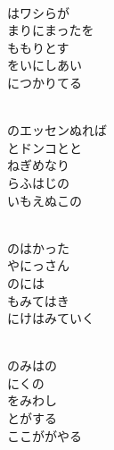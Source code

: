 \documentclass[10pt,b5j]{tarticle} %
\begin{document}
\vspace{1.5em} %
\newcommand{\linespace}{0.5em} %
\newcommand{\blocksize}{0.5\hsize} %
\newcommand{\itemmargin}{6em} %
\begin{enumerate} %
    \setlength{\itemindent}{\itemmargin} %
    \begin{minipage}[c]{\blocksize}
    
        \vspace{\linespace}
        \item~\\
        はワシらが\\
        まりにまったを\\
        ももりとす\\
        をいにしあい\\
        につかりてる
        
        \vspace{\linespace}
        \item~\\
        のエッセンぬれば\\
        とドンコとと\\
        ねぎめなり\\
        らふはじの\\
        いもえぬこの
        
        \vspace{\linespace}
        \item~\\
        のはかった\\
        やにっさん\\
        のには\\
        もみてはき\\
        にけはみていく
        
        \vspace{\linespace}
        \item~\\
        のみはの\\
        にくの\\
        をみわし\\
        とがする\\
        ここががやる
    
    \end{minipage}
\end{enumerate} %
\end{document}
